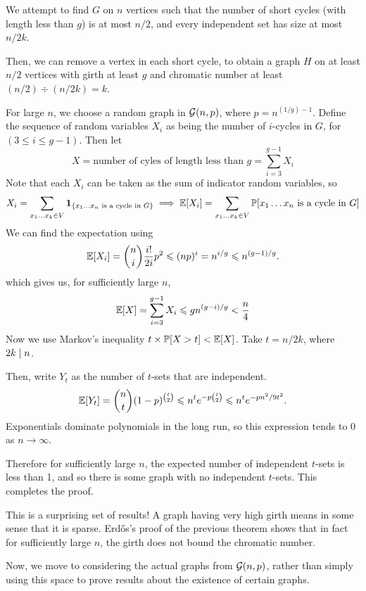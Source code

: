 \documentclass{article}
\begin{document}
\begin{prf}
    We attempt to find $G$ on $n$ vertices such that the number of short cycles (with length less than $g$) is at most $n/2$, and every independent set has size at most $n/2k$.
    
    Then, we can remove a vertex in each short cycle, to obtain a graph $H$ on at least $n/2$ vertices with girth at least $g$ and chromatic number at least $(n/2) \div (n/2k) = k$.
    
    For large $n$, we choose a random graph in $\mathcal{G}(n, p)$, where $p = n^{(1/g) - 1}$. Define the sequence of random variables $X_i$ as being the number of $i$-cycles in $G$, for $(3 \leq i \leq g- 1)$. Then let
    \[
	X = \text{number of cyles of length less than $g$} = \sum_{i=3}^{g-1} X_i
	\]
	Note that each $X_i$ can be taken as the sum of indicator random variables, so
	\[
	X_i = \sum_{x_1 \dots x_k \in V} \textbf{1}_{\left\lbrace x_1 \dots x_n \text{ is a cycle in $G$} \right\rbrace} \implies \mathbb{E}[X_i] = \sum_{x_1 \dots x_k \in V} \mathbb{P}[x_1 \dots x_n \text{ is a cycle in $G$}]
	\]
	We can find the expectation using
	\[
	\mathbb{E}[X_i] = \binom{n}{i} \frac{i!}{2i}p^2 \leqslant (np)^i = n^{i/g} \leqslant n^{(g-1)/g}.
	\]
	which gives us, for sufficiently large $n$,
	\[
	\mathbb{E}[X] = \sum_{i=3}^{g-1} X_i \leqslant gn^{(g-i)/g} < \frac{n}{4}
	\]
	Now we use Markov's inequality $t \times \mathbb{P}[X > t] < \mathbb{E}[X]$. Take $t = n/2k$, where $2k \mid n$.
	
	Then, write $Y_t$ as the number of $t$-sets that are independent.
	\[
	\mathbb{E}[Y_t] = \binom{n}{t} (1-p)^{\binom{t}{2}} \leqslant n^t e^{-p \binom{t}{2}} \leqslant n^t e^{-pn^2/9t^2}.
	\]
	Exponentials dominate polynomials in the long run, so this expression tends to 0 as $n \to \infty$.
	
	Therefore for sufficiently large $n$, the expected number of independent $t$-sets is less than 1, and so there is some graph with no independent $t$-sets. This completes the proof.
\end{prf}

\begin{note}
	This is a surprising set of results! A graph having very high girth means in some sense that it is sparse. Erd{\H o}s's proof of the previous theorem shows that in fact for sufficiently large $n$, the girth does not bound the chromatic number.
\end{note}

Now, we move to considering the actual graphs from $\mathcal{G}(n, p)$, rather than simply using this space to prove results about the existence of certain graphs.
\end{document}
